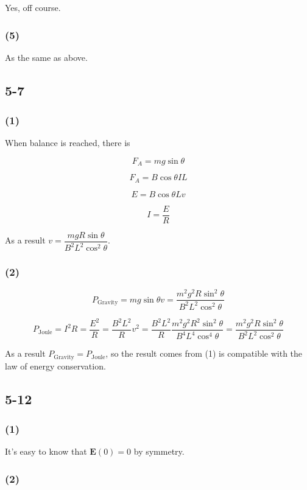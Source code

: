 \documentclass[a4paper,11pt]{amsart}
\theoremstyle{definition}
\begin{document}
	Yes, off course.
	
	\subsubsection*{(5)}
	
	As the same as above.
	
	\subsection*{5-7}
	
	\subsubsection*{(1)}
	
	When balance is reached, there is
	
	$$
	F_A=mg\sin\theta
	$$
	
	$$
	F_A=B\cos\theta IL
	$$
	
	$$
	E=B\cos\theta Lv
	$$
	
	$$
	I=\dfrac{E}{R}
	$$
	
	As a result $v=\dfrac{mgR\sin\theta}{B^2L^2\cos^2\theta}$.
	
	\subsubsection*{(2)}
	
	$$
	P_\text{Gravity}=mg\sin\theta v=\dfrac{m^2g^2R\sin^2\theta}{B^2L^2\cos^2\theta}
	$$
	
	$$
	P_\text{Joule}=I^2R=\dfrac{E^2}{R}=\dfrac{B^2L^2}{R}v^2=\dfrac{B^2L^2}{R}\dfrac{m^2g^2R^2\sin^2\theta}{B^4L^4\cos^4\theta}=\dfrac{m^2g^2R\sin^2\theta}{B^2L^2\cos^2\theta}
	$$
	
	As a result $P_\text{Gravity}=P_\text{Joule}$, so the result comes from (1) is compatible with the law of energy conservation.
	
	\subsection*{5-12}
	
	\subsubsection*{(1)}
	
	It's easy to know that $\bm{E}(0)=0$ by symmetry.
	
	\subsubsection*{(2)}
	
\end{document}
